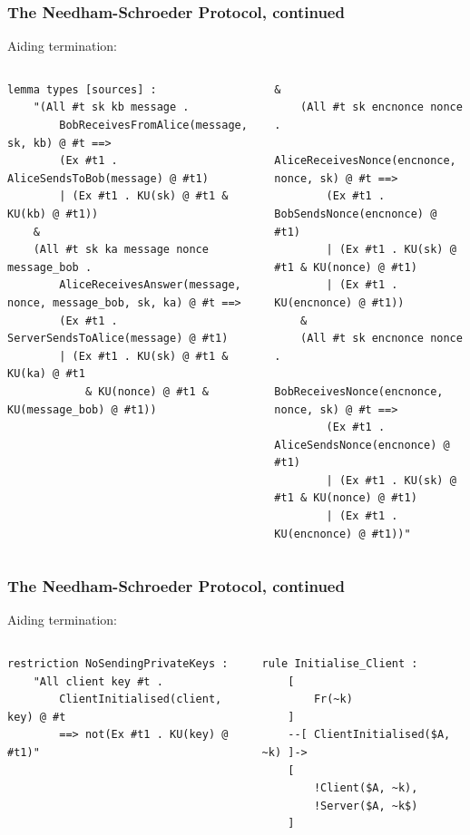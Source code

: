 \documentclass[aspectratio=169,t,xcolor=table]{beamer}
\begin{document}
\begin{frame}[fragile]
    \frametitle{The Needham-Schroeder Protocol, continued}
    Aiding termination:
        \begin{columns}
        \begin{lstlisting}[language=Tamarin]
lemma types [sources] :
    "(All #t sk kb message .
        BobReceivesFromAlice(message, sk, kb) @ #t ==>
        (Ex #t1 . AliceSendsToBob(message) @ #t1)
        | (Ex #t1 . KU(sk) @ #t1 & KU(kb) @ #t1))
    &
    (All #t sk ka message nonce message_bob . 
        AliceReceivesAnswer(message, nonce, message_bob, sk, ka) @ #t ==>
        (Ex #t1 . ServerSendsToAlice(message) @ #t1)
        | (Ex #t1 . KU(sk) @ #t1 & KU(ka) @ #t1
            & KU(nonce) @ #t1 & KU(message_bob) @ #t1))\end{lstlisting}
            \begin{lstlisting}[language=Tamarin]
    &
    (All #t sk encnonce nonce .
        AliceReceivesNonce(encnonce, nonce, sk) @ #t ==>
        (Ex #t1 . BobSendsNonce(encnonce) @ #t1)
        | (Ex #t1 . KU(sk) @ #t1 & KU(nonce) @ #t1)
        | (Ex #t1 . KU(encnonce) @ #t1))
    &
    (All #t sk encnonce nonce .
        BobReceivesNonce(encnonce, nonce, sk) @ #t ==>
        (Ex #t1 . AliceSendsNonce(encnonce) @ #t1)
        | (Ex #t1 . KU(sk) @ #t1 & KU(nonce) @ #t1)
        | (Ex #t1 . KU(encnonce) @ #t1))"
        \end{lstlisting}
        \end{columns}
\end{frame}

\begin{frame}[fragile]
    \frametitle{The Needham-Schroeder Protocol, continued}
    Aiding termination:
    \begin{columns}
    \begin{lstlisting}[language=Tamarin]
restriction NoSendingPrivateKeys :
    "All client key #t .
        ClientInitialised(client, key) @ #t
        ==> not(Ex #t1 . KU(key) @ #t1)"
    \end{lstlisting}
    \begin{lstlisting}[language=Tamarin]
rule Initialise_Client :
    [
        Fr(~k)
    ]
    --[ ClientInitialised($A, ~k) ]->
    [
        !Client($A, ~k),
        !Server($A, ~k$)
    ]\end{lstlisting}
    \end{columns}
\end{frame}
\end{document}
